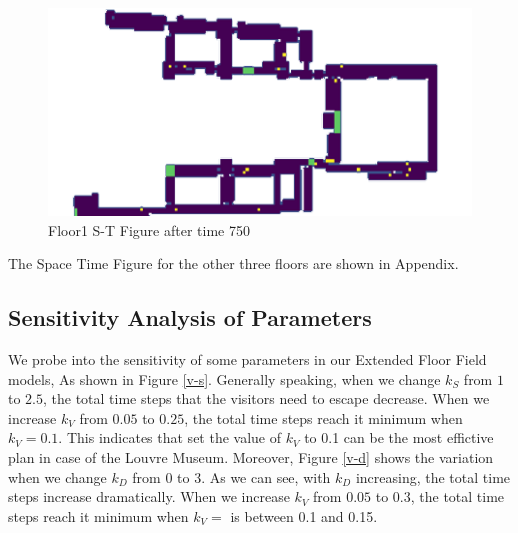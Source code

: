 \documentclass{mcmthesis}
\begin{document}
\begin{figure}[H]
{}
\parbox[b]{.5\textwidth}{
\includegraphics[scale=0.7]{1-4}
\centering\captionsetup{font=small, labelfont=bf}\caption{Floor1 S-T Figure after time 750}
}
\end{figure}

The Space Time Figure for the other three floors are shown in Appendix.

    \subsection{Sensitivity Analysis of Parameters}
We probe into the sensitivity of some parameters in our Extended Floor Field models, As shown in Figure \ref{v-s}. Generally speaking, when we change $k_S$ from $1$ to $2.5$, the total time steps that the visitors need to escape decrease. When we increase $k_V$ from $0.05$ to $0.25$, the total time steps reach it minimum when $k_V=0.1$. This indicates that set the value of $k_V$ to 0.1 can be the most effictive plan in case of the Louvre Museum. Moreover, Figure \ref{v-d} shows the variation when we change $k_D$ from 0 to 3. As we can see, with $k_D$ increasing, the total time steps increase dramatically. When we increase $k_V$ from $0.05$ to $0.3$, the total time steps reach it minimum when $k_V=$ is between 0.1 and 0.15.
\end{document}
